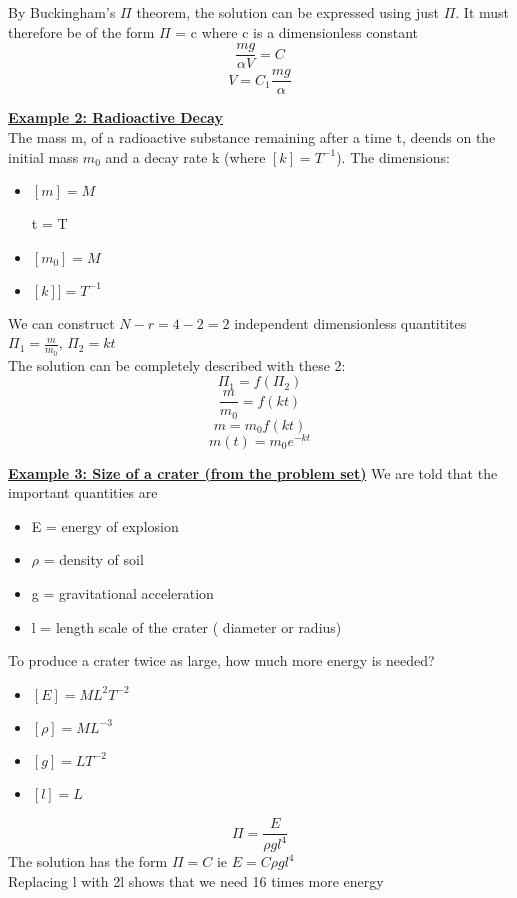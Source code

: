 \documentclass[12pt]{article}
\newcommand{\myt}[1]{\textbf{\underline{#1}}}
\begin{document}
	By Buckingham's $\Pi$ theorem, the solution can be expressed using just $\Pi$. It must therefore be of the form $\Pi$ = c where c is a dimensionless constant\\
	
	$$\frac{mg}{\alpha V} = C$$
	$$V = C_1\frac{mg}{\alpha}$$
	
	\myt{Example 2: Radioactive Decay}\\
	
	The mass m, of a radioactive substance remaining after a time t, deends on the initial mass $m_0$ and a decay rate k (where $[k] = T^{-1}$). The dimensions:\\
	\begin{itemize}
		\item $[m] = M$
		\item [t] = T
		\item $[m_0] = M$
		\item $[k]] = T^{-1}$
	\end{itemize}
	We can construct $N-r = 4-2 = 2$ independent dimensionless quantitites $\Pi_1 = \frac{m}{m_0}$, $\Pi_2 = kt$\\
	The solution can be completely described with these 2:\\
	$$\Pi_1 = f(\Pi_2)$$
	$$\frac{m}{m_0} = f(kt)$$
	$$m = m_0f(kt)$$
	$$m(t) = m_0e^{-kt}$$
	
	\myt{Example 3: Size of a crater (from the problem set)}
	We are told that the important quantities are\\
	\begin{itemize}
		\item E = energy of explosion
		\item $\rho$ = density of soil
		\item g = gravitational acceleration
		\item l = length scale of the crater ( diameter or radius)
	\end{itemize}

	To produce a crater twice as large, how much more energy is needed?\\
	\begin{itemize}
		\item $[E] = ML^2T^{-2}$
		\item $[\rho] = ML^{-3}$
		\item $[g] = LT^{-2}$\
		\item $[l] = L$\
	\end{itemize}

	$$\Pi = \frac{E}{\rho g l^4}$$
	The solution has the form $\Pi = C$ ie $E = C\rho gl^4$\\
	Replacing l with 2l shows that we need 16 times more energy\\
	
\end{document}
